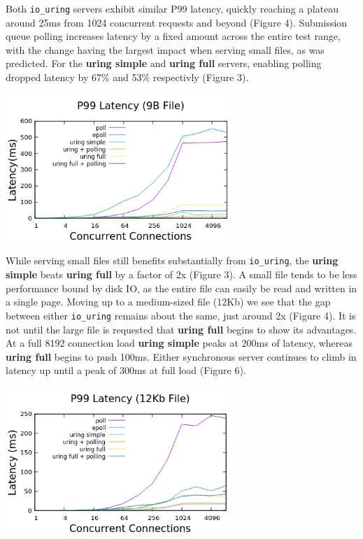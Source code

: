 \documentclass[conference]{IEEEtran}{}
\begin{document}
Both \texttt{io\_uring} servers exhibit similar P99 latency, quickly reaching a plateau around 25ms from 1024 concurrent requests and beyond (Figure 4). Submission queue polling increases latency by a fixed amount across the entire test range, with the change having the largest impact when serving small files, as was predicted. For the \textbf{uring simple} and \textbf{uring full} servers, enabling polling dropped latency by 67\% and 53\% respectivly (Figure 3).

\begin{center}
\includegraphics[width=3.35in]{small_latency.png}
\end{center}

While serving small files still benefits substantially from \texttt{io\_uring}, the \textbf{uring simple} beats \textbf{uring full} by a factor of 2x (Figure 3). A small file tends to be less performance bound by disk IO, as the entire file can easily be read and written in a single page. Moving up to a medium-sized file (12Kb) we see that the gap between either \texttt{io\_uring} remains about the same, just around 2x (Figure 4). It is not until the large file is requested that \textbf{uring full} begins to show its advantages. At a full 8192 connection load \textbf{uring simple} peaks at 200ms of latency, whereas \textbf{uring full} begins to push 100ms. Either synchronous server continues to climb in latency up until a peak of 300ms at full load (Figure 6).

\begin{center}
\includegraphics[width=3.35in]{./med_latency.png}
\end{center}
\end{document}
